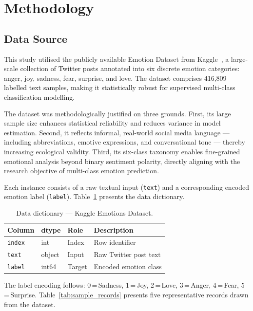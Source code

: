 \section{Methodology}
\label{sec:methodology}

\subsection{Data Source}

This study utilised the publicly available Emotion Dataset from Kaggle~\citep{emotions_kaggle}, a large-scale collection of Twitter posts annotated into six discrete emotion categories: anger, joy, sadness, fear, surprise, and love. The dataset comprises 416,809 labelled text samples, making it statistically robust for supervised multi-class classification modelling.

The dataset was methodologically justified on three grounds. First, its large sample size enhances statistical reliability and reduces variance in model estimation. Second, it reflects informal, real-world social media language --- including abbreviations, emotive expressions, and conversational tone --- thereby increasing ecological validity. Third, its six-class taxonomy enables fine-grained emotional analysis beyond binary sentiment polarity, directly aligning with the research objective of multi-class emotion prediction.

Each instance consists of a raw textual input (\texttt{text}) and a corresponding encoded emotion label (\texttt{label}). Table~\ref{tab:data_dict} presents the data dictionary.

\begin{table}[!htb]
\centering
\caption{Data dictionary --- Kaggle Emotions Dataset.}
\label{tab:data_dict}
\small
\begin{tabular}{@{}llll@{}}
\toprule
\textbf{Column} & \textbf{dtype} & \textbf{Role} & \textbf{Description} \\
\midrule
\texttt{index} & int & Index & Row identifier \\
\texttt{text} & object & Input & Raw Twitter post text \\
\texttt{label} & int64 & Target & Encoded emotion class \\
\bottomrule
\end{tabular}
\end{table}

The label encoding follows: 0\,=\,Sadness, 1\,=\,Joy, 2\,=\,Love, 3\,=\,Anger, 4\,=\,Fear, 5\,=\,Surprise. Table~\ref{tab:sample_records} presents five representative records drawn from the dataset.


